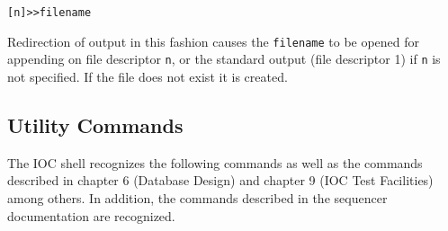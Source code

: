 \begin{verbatim}
[n]>>filename
\end{verbatim}

Redirection of output in this fashion causes the \verb|filename| to be opened for appending on file descriptor \verb|n|, or the 
standard output (file descriptor  1)  if \verb|n| is not specified.  If the file does not exist it is created.

\subsection{Utility Commands}
\label{Utility Commands}

The IOC shell recognizes the following commands as well as the commands described in chapter 6 (Database Design) and 
chapter 9 (IOC Test Facilities) among others.  In addition, the commands described in the sequencer documentation are 
recognized.
